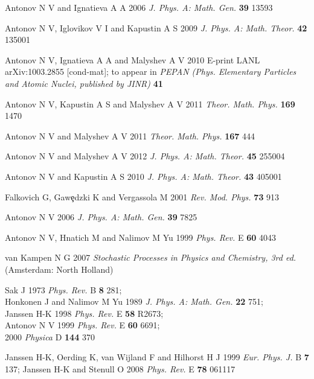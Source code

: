 \begin{thebibliography}{99}
 Antonov N V and Ignatieva A A 2006
{\it J. Phys. A: Math. Gen.} {\bf 39} 13593

 Antonov N V, Iglovikov V I and Kapustin A S 2009
{\it J. Phys. A: Math. Theor.} {\bf 42} 135001

 Antonov N V, Ignatieva A A and Malyshev A V 2010
E-print LANL arXiv:1003.2855 [cond-mat]; to appear in {\it PEPAN
(Phys. Elementary Particles and Atomic Nuclei, published by JINR)} {\bf 41}

Antonov N V, Kapustin A S and Malyshev A V 2011 
{\it Theor. Math. Phys.} 
{\bf 169} 1470


Antonov N V and Malyshev A V 2011 
{\it Theor. Math. Phys.}
{\bf 167} 444

Antonov N V and Malyshev A V 2012 
{\it J. Phys. A: Math. Theor.} 
{\bf 45} 255004


Antonov N V and Kapustin A S 2010 
{\it J. Phys. A: Math. Theor.}
{\bf 43} 405001


 Falkovich G, Gaw\c{e}dzki K and Vergassola M  2001
{\it Rev. Mod. Phys.} {\bf 73} 913

 Antonov N V 2006 {\it J. Phys. A: Math. Gen.} {\bf 39} 7825

 Antonov N V, Hnatich M and Nalimov M Yu 1999
{\it Phys. Rev.} E {\bf 60} 4043

 van Kampen N G 2007 {\it Stochastic Processes in Physics
and Chemistry, 3rd ed.} (Amsterdam: North Holland)

 Sak J 1973 {\it Phys. Rev.} B {\bf 8} 281;\\
Honkonen J and Nalimov M Yu 1989 {\it J. Phys. A: Math. Gen.} {\bf 22} 751;\\
Janssen H-K 1998 {\it Phys. Rev.} E {\bf 58} R2673;\\
Antonov N V 1999 {\it Phys. Rev.} E {\bf 60} 6691;\\
2000 {\it Physica} D {\bf 144} 370

 Janssen H-K, Oerding K, van Wijland F and Hilhorst H J
1999 {\it Eur. Phys. J.} B {\bf 7} 137; Janssen H-K and Stenull O 2008
{\it Phys. Rev.} E {\bf 78} 061117

\end{thebibliography}

